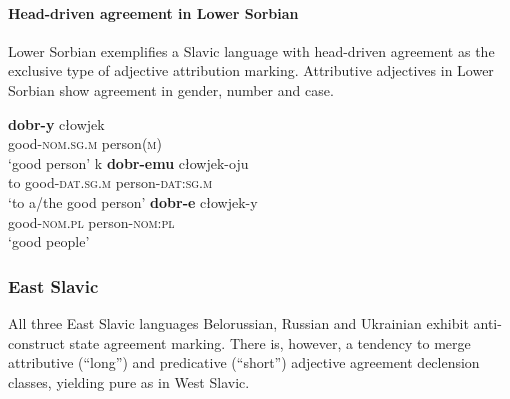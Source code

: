 \paragraph*{Head\hyp{}driven agreement in Lower Sorbian}
Lower Sorbian exemplifies a Slavic language with head\hyp{}driven agreement as the exclusive type of adjective attribution marking. Attributive adjectives in Lower Sorbian show agreement in gender, number and case. 
\begin{exe}
\begin{xlist}
\ex
\gll	\textbf{dobr-y} cłowjek\\
	good-\textsc{nom.sg.m} person(\textsc{m})\\
\glt	‘good person’
\ex
\gll	k \textbf{dobr-emu} cłowjek-oju\\
	to good-\textsc{dat.sg.m} person-\textsc{dat:sg.m}\\
\glt	‘to a/the good person’
\ex
\gll	\textbf{dobr-e} cłowjek-y\\
	good-\textsc{nom.pl} person-\textsc{nom:pl}\\
\glt	‘good people’
\end{xlist}
\end{exe}

\subsubsection{East Slavic}
All three East Slavic languages Belorussian, Russian and Ukrainian exhibit anti\hyp{}construct state agreement marking. There is, however, a tendency to merge attributive (“long”) and predicative (“short”) adjective agreement declension classes, yielding pure  as in West Slavic.

